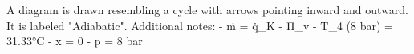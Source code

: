 A diagram is drawn resembling a cycle with arrows pointing inward and outward. It is labeled "Adiabatic".  
Additional notes:  
- ṁ = q̇_K  
- Π_v  
- T_4 (8 bar) = 31.33°C  
- x = 0  
- p = 8 bar